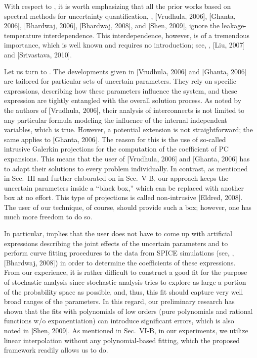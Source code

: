 \begin{authors}
With respect to , it is worth emphasizing that all the prior works based on spectral methods for uncertainty quantification, \ie, [Vrudhula, 2006], [Ghanta, 2006], [Bhardwaj, 2006], [Bhardwaj, 2008], and [Shen, 2009], ignore the leakage-temperature interdependence.
This interdependence, however, is of a tremendous importance, which is well known and requires no introduction; see, \eg, [Liu, 2007] and [Srivastava, 2010].

Let us turn to .
The developments given in [Vrudhula, 2006] and [Ghanta, 2006] are tailored for particular sets of uncertain parameters.
They rely on specific expressions, describing how these parameters influence the system, and these expression are tightly entangled with the overall solution process.
As noted by the authors of [Vrudhula, 2006], their analysis of interconnects is not limited to any particular formula modeling the influence of the internal independent variables, which is true.
However, a potential extension is not straightforward; the same applies to [Ghanta, 2006].
The reason for this is the use of so-called intrusive Galerkin projections for the computation of the coefficient of PC expansions.
This means that the user of [Vrudhula, 2006] and [Ghanta, 2006] has to adapt their solutions to every problem individually.
In contrast, as mentioned in Sec.~III and further elaborated on in Sec.~V-B, our approach keeps the uncertain parameters inside a ``black box,'' which can be replaced with another box at no effort.
This type of projections is called non-intrusive [Eldred, 2008].
The user of our technique, of course, should provide such a box; however, one has much more freedom to do so.

In particular,  implies that the user does not have to come up with artificial expressions describing the joint effects of the uncertain parameters and to perform curve fitting procedures to the data from SPICE simulations (see, \eg, [Bhardwaj, 2008]) in order to determine the coefficients of these expressions.
From our experience, it is rather difficult to construct a good fit for the purpose of stochastic analysis since stochastic analysis tries to explore as large a portion of the probability space as possible, and, thus, this fit should capture very well broad ranges of the parameters.
In this regard, our preliminary research has shown that the fits with polynomials of low orders (pure polynomials and rational functions w/o exponentiation) can introduce significant errors, which is also noted in [Shen, 2009].
As mentioned in Sec.~VI-B, in our experiments, we utilize linear interpolation without any polynomial-based fitting, which the proposed framework readily allows us to do.


\end{authors}

